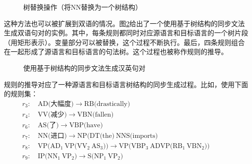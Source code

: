 \begin{figure}[htp]
\centering

\caption{树替换操作（将NN替换为一个树结构）}
\label{fig:8-20}
\end{figure}

\parinterval 这种方法也可以被扩展到双语的情况。图\ref{fig:8-21}给出了一个使用基于树结构的同步文法生成双语句对的实例。其中，每条规则都同时对应源语言和目标语言的一个树片段（用矩形表示）。变量部分可以被替换，这个过程不断执行。最后，四条规则组合在一起形成了源语言和目标语言的句法树。这个过程也被称作规则的推导。

\begin{figure}[htp]
\centering

\caption{使用基于树结构的同步文法生成汉英句对}
\label{fig:8-21}
\end{figure}

\parinterval 规则的推导对应了一种源语言和目标语言树结构的同步生成过程。比如，使用下面的规则集：
{
\begin{eqnarray}
r_3: \quad \textrm{AD(大幅度)} \rightarrow \textrm{RB(drastically)}\qquad\qquad\qquad\qquad\qquad\qquad\qquad\ \nonumber \\
r_4: \quad \textrm{VV(减少)} \rightarrow \textrm{VBN(fallen)}\qquad\qquad\qquad\qquad\qquad\qquad\qquad\qquad\ \,\nonumber \\
r_6: \quad \textrm{AS(了)} \rightarrow \textrm{VBP(have)}\qquad\qquad\qquad\qquad\qquad\qquad\qquad\qquad\qquad\, \nonumber \\
r_7: \quad \textrm{NN(进口)} \rightarrow \textrm{NP(DT(the)}\ \textrm{NNS(imports)} \nonumber\ \qquad\qquad\qquad\qquad\qquad\ \,\\
r_8: \quad \textrm{VP(}\textrm{AD}_1\ \textrm{VP(} \textrm{VV}_2\ \textrm{AS}_3)) \rightarrow \textrm{VP(}\textrm{VBP}_3\ \textrm{ADVP(} \textrm{RB}_1\ \textrm{VBN}_2))\ \nonumber \qquad\ \ \,\\
r_9: \quad \textrm{IP(}\textrm{NN}_1\ \textrm{VP}_2) \rightarrow \textrm{S(}\textrm{NP}_1\ \textrm{VP}_2) \qquad\qquad\qquad\qquad\qquad\qquad\qquad\nonumber\ \ \ \ \,
\end{eqnarray}
}

